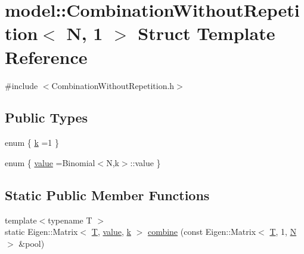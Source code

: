 \hypertarget{structmodel_1_1_combination_without_repetition_3_01_n_00_011_01_4}{}\section{model\+:\+:Combination\+Without\+Repetition$<$ N, 1 $>$ Struct Template Reference}
\label{structmodel_1_1_combination_without_repetition_3_01_n_00_011_01_4}


{\ttfamily \#include $<$Combination\+Without\+Repetition.\+h$>$}

\subsection*{Public Types}
\begin{DoxyCompactItemize}
\item 
enum \{ \hyperlink{structmodel_1_1_combination_without_repetition_3_01_n_00_011_01_4_a3f3bc5918973d2a164a3b3532b9bca22abf89bd4763c1a1f9402216f1cb119b61}{k} =1
 \}
\item 
enum \{ \hyperlink{structmodel_1_1_combination_without_repetition_3_01_n_00_011_01_4_a598aec62816f3475c8817bd7c1df9f94a132a28c9d1da8ea9ee8fb1df6c4e507f}{value} =Binomial$<$N,k$>$\+:\+:value
 \}
\end{DoxyCompactItemize}
\subsection*{Static Public Member Functions}
\begin{DoxyCompactItemize}
\item 
{\footnotesize template$<$typename T $>$ }\\static Eigen\+::\+Matrix$<$ \hyperlink{_spline_node_base__corder1_8h_a82692d3a5502b91460591f1d5504314a}{T}, \hyperlink{structmodel_1_1_combination_without_repetition_3_01_n_00_011_01_4_a598aec62816f3475c8817bd7c1df9f94a132a28c9d1da8ea9ee8fb1df6c4e507f}{value}, \hyperlink{structmodel_1_1_combination_without_repetition_3_01_n_00_011_01_4_a3f3bc5918973d2a164a3b3532b9bca22abf89bd4763c1a1f9402216f1cb119b61}{k} $>$ \hyperlink{structmodel_1_1_combination_without_repetition_3_01_n_00_011_01_4_ac86a162567ceddf12787eb0d1ec1c58b}{combine} (const Eigen\+::\+Matrix$<$ \hyperlink{_spline_node_base__corder1_8h_a82692d3a5502b91460591f1d5504314a}{T}, 1, \hyperlink{thompson__tetrahedron_8m_a7823765a845eb81829f110d8337f81ae}{N} $>$ \&pool)
\end{DoxyCompactItemize}


